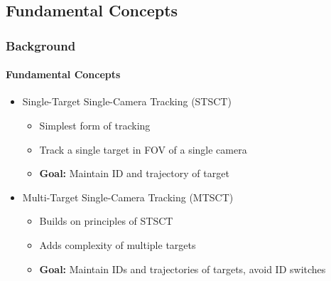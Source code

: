 \subsection{Fundamental Concepts}
\begin{frame}
    \frametitle{Background}
    \framesubtitle{Fundamental Concepts}

    \begin{itemize}
        \item<1->Single-Target Single-Camera Tracking (STSCT)
              \begin{itemize}
                  \item Simplest form of tracking
                  \item Track a single target in FOV of a single camera
                  \item \textbf{Goal:} Maintain ID and trajectory of target
              \end{itemize}
              \vspace{5pt}
        \item<2->Multi-Target Single-Camera Tracking (MTSCT)
              \begin{itemize}
                  \item Builds on principles of STSCT
                  \item Adds complexity of multiple targets
                  \item \textbf{Goal:} Maintain IDs and trajectories of targets, avoid ID switches
              \end{itemize}
    \end{itemize}
\end{frame}

